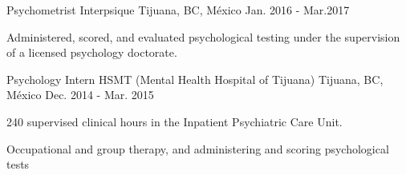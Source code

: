 \begin{cventries}
    \cventry
        {Psychometrist}
        {Interpsique}
        {Tijuana, BC, México}
        {Jan. 2016 - Mar.2017}
        {
            \begin{cvitems}
                \item {Administered, scored, and evaluated psychological testing under the supervision of a licensed psychology doctorate.}
            \end{cvitems}
        }
    \cventry
        {Psychology Intern}
        {HSMT (Mental Health Hospital of Tijuana)}
        {Tijuana, BC, México}
        {Dec. 2014 - Mar. 2015}
        {
            \begin{cvitems}
                \item {240 supervised clinical hours in the Inpatient Psychiatric Care Unit.}
                \item {Occupational and group therapy, and administering and scoring psychological tests}
            \end{cvitems}
        }
\end{cventries}
